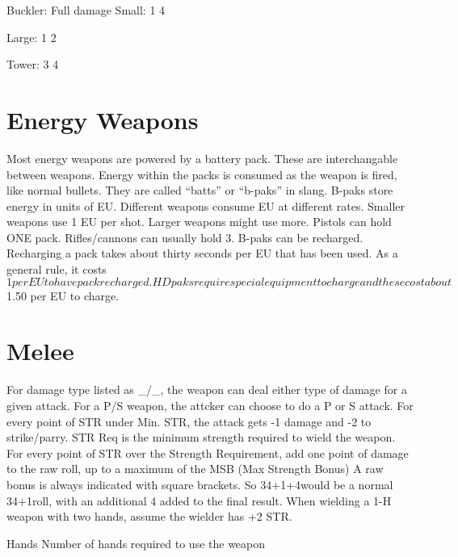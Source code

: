 \documentclass[twoside]{book}
\begin{document}
                    Buckler: Full damage   
                    Small:  1  4
                   
                    
                    Large:  1  2
                   
                    
                    Tower:  3  4
                   
                    
                  
                
            
\section{Energy Weapons}
      Most energy weapons are powered by a battery pack.
             These are interchangable between weapons. Energy within the
             packs is consumed as the weapon is fired, like normal
             bullets. They are called “batts” or
             “b-paks” in slang. B-paks store energy in units
             of EU. Different weapons consume EU at different rates.
             Smaller weapons use 1 EU per shot. Larger weapons might use
             more. Pistols can hold ONE pack. Rifles/cannons can usually
             hold 3. B-paks can be recharged. Recharging a pack takes
             about thirty seconds per EU that has been used. As a general
             rule, it costs $1 per EU to have pack recharged. HD paks
             require special equipment to charge and these cost about
             $1.50 per EU to charge. 
\section{Melee}
      For damage type listed as _/_, the weapon can deal
             either type of damage for a given attack. For a P/S weapon,
             the attcker can choose to do a P or S attack. For every
             point of STR under Min. STR, the attack gets -1 damage and
             -2 to strike/parry. STR Req is the minimum strength required
             to wield the weapon. For every point of STR over the
             Strength Requirement, add one point of damage to the raw
             roll, up to a maximum of the MSB (Max Strength Bonus) A raw
             bonus is always indicated with square brackets. So 34+1+4would be a normal 34+1roll, with an additional 4
             added to the final result. When wielding a 1-H weapon with
             two hands, assume the wielder has +2 STR.   
            
                Hands   Number of hands
                required to use the weapon
              
\end{document}
